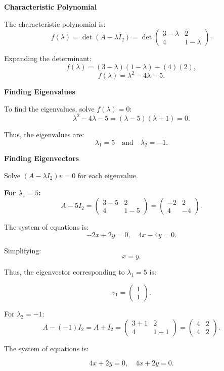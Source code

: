 \documentclass[a4paper,12pt]{article}
\begin{document}
\begin{frame}
\[\]

\textbf{Characteristic Polynomial}

\small

The characteristic polynomial is:
\[
f(\lambda) = \det(A - \lambda I_2) = \det\begin{pmatrix} 3-\lambda & 2 \\ 4 & 1-\lambda \end{pmatrix}.
\]

Expanding the determinant:
\[
f(\lambda) = (3-\lambda)(1-\lambda) - (4)(2),
\]
\[
f(\lambda) = \lambda^2 - 4\lambda - 5.
\]

\textbf{Finding Eigenvalues}

To find the eigenvalues, solve \( f(\lambda) = 0 \):
\[
\lambda^2 - 4\lambda - 5 = (\lambda - 5)(\lambda + 1) = 0.
\]

Thus, the eigenvalues are:
\[
\lambda_1 = 5 \quad \text{and} \quad \lambda_2 = -1.
\]

\textbf{Finding Eigenvectors}

Solve \( (A - \lambda I_2)v = 0 \) for each eigenvalue.

\textbf{For \( \lambda_1 = 5 \):}
\[
A - 5I_2 = \begin{pmatrix} 3-5 & 2 \\ 4 & 1-5 \end{pmatrix} = \begin{pmatrix} -2 & 2 \\ 4 & -4 \end{pmatrix}.
\]

The system of equations is:
\[
-2x + 2y = 0, \quad 4x - 4y = 0.
\]

Simplifying:
\[
x = y.
\]

Thus, the eigenvector corresponding to \( \lambda_1 = 5 \) is:

\[
v_1 = \begin{pmatrix} 1 \\ 1 \end{pmatrix}.
\]

\textbf{}{For \( \lambda_2 = -1 \):}
\[
A - (-1)I_2 = A + I_2 = \begin{pmatrix} 3+1 & 2 \\ 4 & 1+1 \end{pmatrix} = \begin{pmatrix} 4 & 2 \\ 4 & 2 \end{pmatrix}.
\]

The system of equations is:

\[
4x + 2y = 0, \quad 4x + 2y = 0.
\]


\end{frame}
\end{document}
